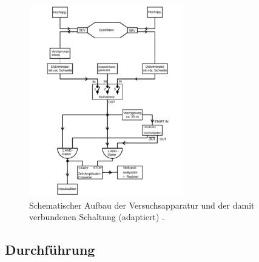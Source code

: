%
\begin{figure}[htb]
  \centering
  \includegraphics[width=0.6\textwidth]{figures/versuchsaufbau.pdf}
  \caption{Schematischer Aufbau der Versuchsapparatur und der damit verbundenen Schaltung (adaptiert) \cite{V01}.}
  \label{fig:aufbau}
\end{figure}
%
\subsection{Durchführung}

